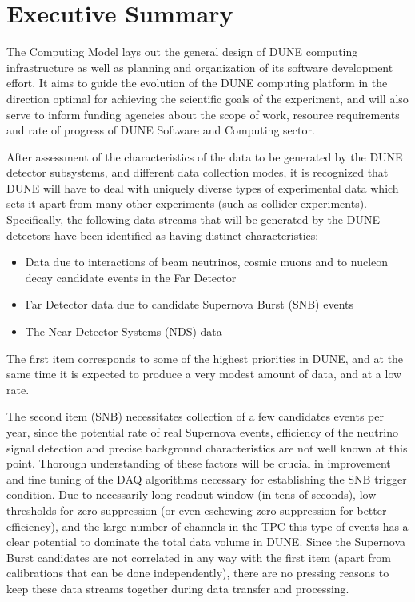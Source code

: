 \section{Executive Summary}
The Computing Model lays out the general design of DUNE computing infrastructure as well as planning and
organization of its software development effort. It aims to guide the evolution of the DUNE computing
platform in the direction optimal for achieving the scientific goals of the experiment, and will also serve
to inform funding agencies about the scope of work, resource requirements and rate of progress of 
DUNE Software and Computing sector.

After assessment of the characteristics of the data to be generated by the DUNE detector subsystems,
and different data collection modes, it is recognized that DUNE will have to deal with uniquely diverse
types of experimental data which sets it apart from many other experiments (such as collider experiments). Specifically,
the following data streams that will be generated by the DUNE detectors have been identified as having distinct characteristics:
\begin{itemize}

\item Data due to interactions of beam neutrinos, cosmic muons and to nucleon decay candidate events in the Far Detector

\item Far Detector data due to candidate Supernova Burst (SNB) events

\item The Near Detector Systems (NDS) data

\end{itemize}

\noindent
The first item corresponds to some of the highest priorities in DUNE, and at the same time it is expected to produce
a very modest amount of data, and at a low rate.

The second item (SNB) necessitates collection of a few candidates
events per year, since the potential rate of real Supernova events, efficiency of the neutrino signal detection
and precise background characteristics are not well known at this point. Thorough understanding of these factors will be crucial
in improvement and fine tuning of the DAQ algorithms necessary for establishing the SNB trigger condition.
Due to necessarily long readout window (in tens of seconds), low thresholds for zero suppression (or even
eschewing zero suppression for better efficiency), and the large number of channels in the TPC this type of events
has a clear potential to dominate the total data volume in DUNE. Since the Supernova Burst candidates are not correlated
in any way with the first item (apart from calibrations that can be done independently), there are no pressing reasons to keep
these data streams together during data transfer and processing.

